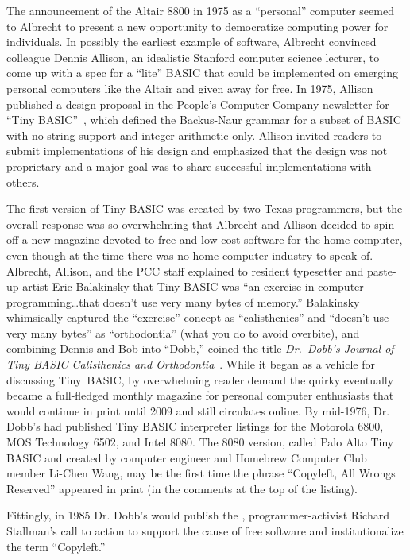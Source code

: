 The announcement of the Altair 8800 in 1975 as a ``personal'' computer
seemed to Albrecht to present a new opportunity to democratize computing
power for individuals.
In possibly the earliest example of  software, Albrecht
convinced colleague Dennis Allison, an idealistic Stanford computer
science lecturer, to come up with a spec for a ``lite'' BASIC that could
be implemented on emerging personal
computers like the Altair and given
away for free.
In 1975, Allison published a design proposal in the People's Computer
Company newsletter for ``Tiny
BASIC''~\cite{allison_tiny_basic}, which defined the Backus-Naur grammar
for a subset of BASIC with no string support and integer arithmetic only.
Allison invited readers to submit implementations of his design and
emphasized that the design was not proprietary and a major goal was to
share successful implementations with others.

The first version of Tiny BASIC was created by two Texas programmers,
but the overall response was so overwhelming that Albrecht and Allison
decided to spin off a new magazine devoted to free and low-cost software
for the home computer, even though at the time there was no home
computer industry to speak of.
Albrecht, Allison, and the PCC staff explained to resident typesetter
and paste-up artist Eric Balakinsky that Tiny BASIC was ``an exercise in
computer programming\ldots{}that doesn't use very many bytes of
memory.''
Balakinsky whimsically captured the ``exercise'' concept as
``calisthenics'' and ``doesn't use very many bytes'' as ``orthodontia''
(what you do to avoid overbite), and combining Dennis and Bob into
``Dobb,'' coined the title \emph{Dr.~Dobb's Journal of Tiny BASIC
Calisthenics and Orthodontia}~\cite[p.~265]{dormouse}.
While it began as a vehicle for discussing Tiny~BASIC, by overwhelming
reader demand the quirky  eventually became a
full-fledged monthly magazine for personal computer enthusiasts that
would continue in print until 2009 and still circulates online.
By mid-1976, Dr. Dobb's had published Tiny BASIC interpreter listings
for the Motorola 6800, MOS Technology 6502, and Intel 8080.
The 8080
version, called Palo Alto Tiny BASIC and created by computer engineer
and Homebrew Computer Club member Li-Chen Wang, may be the first time
the phrase ``Copyleft, All Wrongs Reserved'' appeared in print (in the
comments at the top of the listing).

\begin{tangent}
Fittingly, in 1985 Dr. Dobb's would publish the ,
programmer-activist Richard Stallman's call to action to support the
cause of free software and institutionalize the term ``Copyleft.''
\end{tangent}

